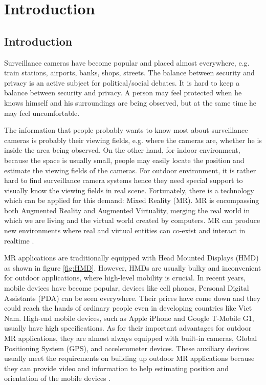 \chapter{Introduction}
\label{Chapter1}


\section{Introduction}

Surveillance cameras have become popular and placed almost everywhere, e.g. train stations, airports, banks, shops, streets. The balance between security and privacy is an active subject for political/social debates. It is hard to keep a balance between security and privacy. A person may feel protected when he knows himself and his surroundings are being observed, but at the same time he may feel uncomfortable.

The information that people probably wants to know most about surveillance cameras is probably their viewing fields, e.g. where the cameras are, whether he is inside the area being observed. On the other hand, for indoor environment, because the space is usually small, people may easily locate the position and estimate the viewing fields of the cameras. For outdoor environment, it is rather hard to find surveillance camera systems hence they need special support to visually know the viewing fields in real scene. Fortunately, there is a technology which can be applied for this demand: Mixed Reality (MR). MR is encompassing both Augmented Reality and Augmented Virtuality, merging the real world in which we are living and the virtual world created by computers. MR can produce new environments where real and virtual entities can co-exist and interact in realtime \cite{Reference3}.

MR applications are traditionally equipped with Head Mounted Displays (HMD) as shown in figure \ref{fig:HMD}. However, HMDs are usually bulky and inconvenient for outdoor applications, where high-level mobility is crucial. In recent years, mobile devices have become popular, devices like cell phones, Personal Digital Assistants (PDA) can be seen everywhere. Their prices have come down and they could reach the hands of ordinary people even in developing countries like Viet Nam. High-end mobile devices, such as Apple iPhone and Google T-Mobile G1, usually have high specifications. As for their important advantages for outdoor MR applications, they are almost always equipped with built-in cameras, Global Positioning System (GPS), and accelerometer devices. These auxiliary devices usually meet the requirements on building up outdoor MR applications because they can provide video and information to help estimating position and orientation of the mobile devices \cite{Reference2} \cite{Reference4}.

